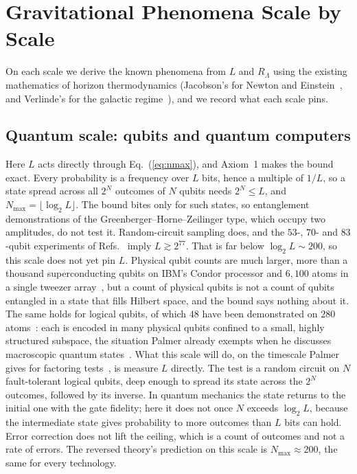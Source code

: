 \documentclass[aps,prd,twocolumn,superscriptaddress,nofootinbib,showkeys]{revtex4-2}
\begin{document}
\section{Gravitational Phenomena Scale by Scale}
\label{sec:scales}

On each scale we derive the known phenomena from $L$ and $R_\Lambda$ using the existing mathematics of horizon thermodynamics (Jacobson's for Newton and Einstein~\cite{jacobson1995}, and Verlinde's for the galactic regime~\cite{verlinde2017}), and we record what each scale pins.

\subsection{Quantum scale: qubits and quantum computers}

Here $L$ acts directly through Eq.~(\ref{eq:nmax}), and Axiom~1 makes the bound exact. Every probability is a frequency over $L$ bits, hence a multiple of $1/L$, so a state spread across all $2^N$ outcomes of $N$ qubits needs $2^N\le L$, and $N_{\max}=\lfloor\log_2L\rfloor$. The bound bites only for such states, so entanglement demonstrations of the Greenberger--Horne--Zeilinger type, which occupy two amplitudes, do not test it. Random-circuit sampling does, and the $53$-, $70$- and $83$-qubit experiments of Refs.~\cite{arute2019,morvan2024,gao2025} imply $L\gtrsim2^{77}$. That is far below $\log_2L\sim200$, so this scale does not yet pin $L$. Physical qubit counts are much larger, more than a thousand superconducting qubits on IBM's Condor processor and $6{,}100$ atoms in a single tweezer array~\cite{manetsch2025}, but a count of physical qubits is not a count of qubits entangled in a state that fills Hilbert space, and the bound says nothing about it. The same holds for logical qubits, of which $48$ have been demonstrated on $280$ atoms~\cite{bluvstein2024}: each is encoded in many physical qubits confined to a small, highly structured subspace, the situation Palmer already exempts when he discusses macroscopic quantum states~\cite{palmer2026}. What this scale will do, on the timescale Palmer gives for factoring tests~\cite{palmer2026,gidney2025}, is measure $L$ directly. The test is a random circuit on $N$ fault-tolerant logical qubits, deep enough to spread its state across the $2^N$ outcomes, followed by its inverse. In quantum mechanics the state returns to the initial one with the gate fidelity; here it does not once $N$ exceeds $\log_2L$, because the intermediate state gives probability to more outcomes than $L$ bits can hold. Error correction does not lift the ceiling, which is a count of outcomes and not a rate of errors. The reversed theory's prediction on this scale is $N_{\max}\approx200$, the same for every technology.
\end{document}
